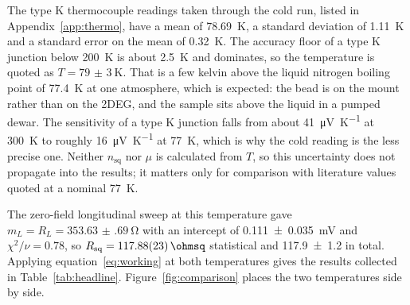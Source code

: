 \documentclass[11pt,a4paper]{article}
\newcommand{\Rsq}{R_{\mathrm{sq}}}
\newcommand{\nsq}{n_{\mathrm{sq}}}
\begin{document}
The type K thermocouple readings taken through the cold run, listed in
Appendix~\ref{app:thermo}, have a mean of
\qty{78.69}{\kelvin}, a standard deviation of \qty{1.11}{\kelvin} and a standard error on the
mean of \qty{0.32}{\kelvin}. The accuracy floor of a type K junction below
\qty{200}{\kelvin} is about \qty{2.5}{\kelvin} and dominates, so the temperature is quoted as
$T = \qty{79(3)}{\kelvin}$. That is a few kelvin above the liquid nitrogen boiling point of
\qty{77.4}{\kelvin} at one atmosphere, which is expected: the bead is on the mount rather
than on the 2DEG, and the sample sits above the liquid in a pumped dewar. The sensitivity of
a type K junction falls from about \qty{41}{\micro\volt\per\kelvin} at \qty{300}{\kelvin} to
roughly \qty{16}{\micro\volt\per\kelvin} at \qty{77}{\kelvin}, which is why the cold reading
is the less precise one. Neither $\nsq$ nor $\mu$ is calculated from $T$, so this uncertainty
does not propagate into the results; it matters only for comparison with literature values
quoted at a nominal \qty{77}{\kelvin}.

The zero-field longitudinal sweep at this temperature gave
$m_L = R_L = \qty{353.63(69)}{\ohm}$ with an intercept of \qty{0.111(35)}{\milli\volt} and
$\chi^2/\nu = 0.78$, so $\Rsq = \qty{117.88(23)}{\ohmsq}$ statistical and
\qty{117.9(12)}{\ohmsq} in total. Applying equation~\eqref{eq:working} at both temperatures
gives the results collected in Table~\ref{tab:headline}. Figure~\ref{fig:comparison} places
the two temperatures side by side.
\end{document}
